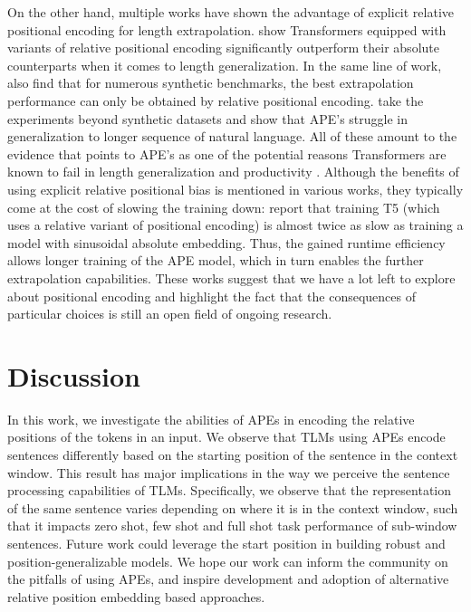 \documentclass[letterpaper, 12pt]{report}
\begin{document}
On the other hand, multiple works have shown the advantage of explicit relative positional encoding for length extrapolation.
\citet{csordas2021:devil} show Transformers equipped with variants of relative positional encoding \citep{dai-2019:transformerxl, shaw-etal-2018-self} significantly outperform their absolute counterparts when it comes to length generalization.
In the same line of work, \citet{ontanon2022:compgen} also find that for numerous synthetic benchmarks, the best extrapolation performance can only be obtained by relative positional encoding.
\citet{press2022train} take the experiments beyond synthetic datasets and show that APE's struggle in generalization to longer sequence of natural language.
All of these amount to the evidence that points to APE's as one of the potential reasons Transformers are known to fail in length generalization and productivity \citep{pcfg,Lake2018:SCAN}.
Although the benefits of using explicit relative positional bias is mentioned in various works, they typically come at the cost of slowing the training down: \citep{press2022train} report that training T5 (which uses a relative variant of positional encoding) is almost twice as slow as training a model with sinusoidal absolute embedding. Thus, the gained runtime efficiency allows longer training of the APE model, which in turn enables the further extrapolation capabilities.
These works suggest that we have a lot left to explore about positional encoding and highlight the fact that the consequences of particular choices is still an open field of ongoing research.



\section{Discussion}
\label{sec:pos_discussion}

In this work, we investigate the abilities of APEs in encoding the relative positions of the tokens in an input. We observe that TLMs using APEs encode sentences differently based on the starting position of the sentence in the context window. This result has major implications in the way we perceive the sentence processing capabilities of TLMs.
Specifically, we observe that the representation of the same sentence varies depending on where it is in the context window, such that it impacts zero shot, few shot and full shot task performance of sub-window sentences.
Future work could leverage the start position in building robust and position-generalizable models. We hope our work can inform the community on the pitfalls of using APEs, and inspire development and adoption of alternative relative position embedding based approaches.
\end{document}
